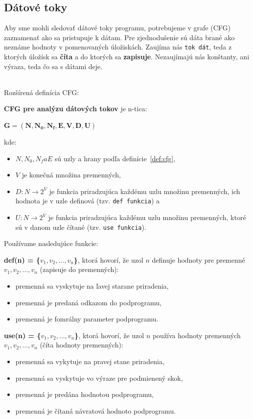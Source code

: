 \subsection{Dátové toky}
Aby sme mohli sledovať dátové toky programu, potrebujeme v grafe (CFG) zaznamenať ako sa pristupuje k dátam.
Pre zjednodušenie sú dáta brané ako neznáme hodnoty v pomenovaných úložiskách.
Zaujíma nás \texttt{tok dát}, teda z ktorých úložísk sa \textbf{číta} a do ktorých sa \textbf{zapisuje}.
Nezaujímajú nás konštanty, ani výraza, teda čo sa s dátami deje.

\\
Rozšírená definícia CFG:
\begin{definition}
	\textbf{CFG pre analýzu dátových tokov} je n-tica: 
	\begin{center}
		$\mathbf{G = (N, N_0, N_f, E, V, D, U)}$
	\end{center}
	kde:
	\begin{itemize}
		\item $N, N_0, N_f a E$ sú uzly a hrany podľa definície~\ref{def:cfg},
		\item $V$ je konečná množina premenných,
		\item $D: N \rightarrow 2^V$ je funkcia priradzujúca každému uzlu množinu premenných, ich hodnota je v uzle definová (tzv. \texttt{def funkcia}) a
		\item $U: N \rightarrow 2^V$ je funkcia priradzujúca každému uzlu množinu premenných, ktoré sú v danom uzle čítané (tzv. \texttt{use funkcia}).
	\end{itemize}
\end{definition}

Používame nasledujúce funkcie:
\begin{description}
\item \textbf{def(n) = \{$v_1, v_2, \ldots, v_n$\}}, ktorá hovorí, že uzol $n$ definuje hodnoty pre premenné $v_1, v_2, \ldots, v_n$ (zapisuje do premenných):
	\begin{itemize}
		\item premenná sa vyskytuje na ľavej starane priradenia,
		\item premenná je predaná odkazom do podprogramu,
		\item premenná je fomrálny parameter podprogramu.
	\end{itemize}
\item \textbf{use(n) = \{$v_1, v_2, \ldots, v_n$\}}, ktorá hovorí, že uzol $n$ používa hodnoty premenných $v_1, v_2, \ldots, v_n$ (číta hodnoty premenných):
	\begin{itemize}
		\item premenná sa vykytuje na pravej stane priradenia,
		\item premenná sa vyskytuje vo výraze pre podmienený skok,
		\item premenná je predána hodnotou podprogramu,
		\item premenná je čítaná návratová hodnoto podprogramu.
	\end{itemize}
\end{description}

